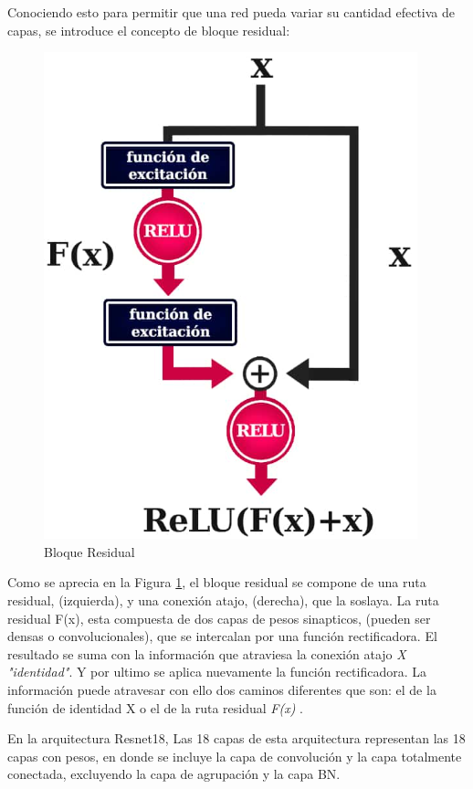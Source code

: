 Conociendo esto para permitir que una red pueda variar su cantidad efectiva de capas, se introduce el concepto de bloque residual:

\begin{figure}[ht]
	\centering
	\includegraphics[scale=0.6]{Figs/67.png}
	\caption{Bloque Residual}
	\label{fig:Bloque}
\end{figure}

Como se aprecia en la Figura \ref{fig:Bloque}, el bloque residual se compone de una ruta residual, (izquierda), y una conexión atajo, (derecha), que la soslaya. La ruta residual F(x), esta compuesta de dos capas de pesos sinapticos, (pueden ser densas o convolucionales), que se intercalan por una función rectificadora. El resultado se suma con la información que atraviesa la conexión atajo \textit{X "identidad"}. Y por ultimo se aplica nuevamente la función rectificadora. La información puede atravesar con ello dos caminos diferentes que son: el de la función de identidad X o el de la ruta residual \textit{F(x)} \cite{ref_5}.

\newpage
En la arquitectura Resnet18, Las 18 capas de esta arquitectura representan las 18 capas con pesos, en donde se incluye la capa de convolución y la capa totalmente conectada, excluyendo la capa de agrupación y la capa BN.


